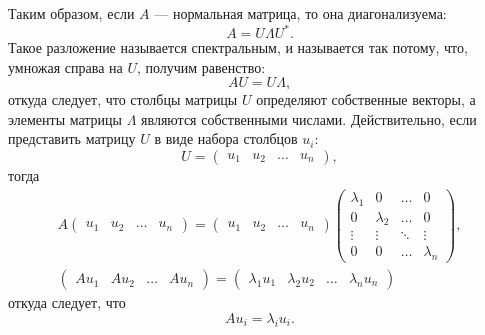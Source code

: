 Таким образом, если $A$ --- нормальная матрица, то она диагонализуема:
\begin{equation}
    \label{rayleigh:spectral:decomposition}
    A = U \Lambda U^* .
\end{equation}
Такое разложение называется спектральным, и называется так потому, что, умножая справа на $U$, получим равенство:
\[
    A U = U \Lambda,
\]
откуда следует, что столбцы матрицы $U$ определяют собственные векторы, а элементы матрицы $\Lambda$ являются собственными числами. Действительно, если представить матрицу $U$
в виде набора столбцов $u_i$:
\[
    U = \begin{pmatrix}
            u_1 & u_2 & \dots & u_n
    \end{pmatrix} ,
\]
тогда
\begin{gather*}
    A \begin{pmatrix}
          u_1 & u_2 & \dots & u_n
    \end{pmatrix}
    =
    \begin{pmatrix}
        u_1 & u_2 & \dots & u_n
    \end{pmatrix}
    \begin{pmatrix}
        \lambda_1 & 0         & \dots  & 0         \\
        0         & \lambda_2 & \dots  & 0         \\
        \vdots    & \vdots    & \ddots & \vdots    \\
        0         & 0         & \dots  & \lambda_n
    \end{pmatrix} , \\
    \begin{pmatrix}
        A u_1 & A u_2 & \dots & A u_n
    \end{pmatrix}
    =
    \begin{pmatrix}
        \lambda_1 u_1 & \lambda_2 u_2 & \dots & \lambda_n u_n
    \end{pmatrix}
\end{gather*}
откуда следует, что
\[
    A u_i = \lambda_i u_i .
\]

